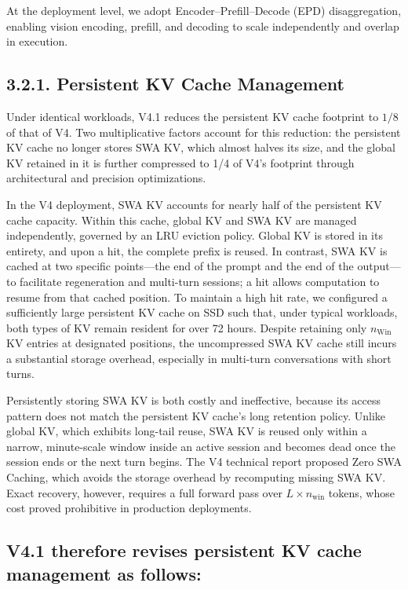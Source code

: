 \documentclass[
  10
]{article}
\begin{document}
At the deployment level, we adopt Encoder--Prefill--Decode (EPD)
disaggregation, enabling vision encoding, prefill, and decoding to scale
independently and overlap in execution.

\subsection{3.2.1. Persistent KV Cache
Management}\label{persistent-kv-cache-management}

Under identical workloads, V4.1 reduces the persistent KV cache
footprint to \(1 / 8\) of that of V4. Two multiplicative factors account
for this reduction: the persistent KV cache no longer stores SWA KV,
which almost halves its size, and the global KV retained in it is
further compressed to 1/4 of V4's footprint through architectural and
precision optimizations.

In the V4 deployment, SWA KV accounts for nearly half of the persistent
KV cache capacity. Within this cache, global KV and SWA KV are managed
independently, governed by an LRU eviction policy. Global KV is stored
in its entirety, and upon a hit, the complete prefix is reused. In
contrast, SWA KV is cached at two specific points---the end of the
prompt and the end of the output---to facilitate regeneration and
multi-turn sessions; a hit allows computation to resume from that cached
position. To maintain a high hit rate, we configured a sufficiently
large persistent KV cache on SSD such that, under typical workloads,
both types of KV remain resident for over 72 hours. Despite retaining
only \(n _ { \mathrm { W i n } }\) KV entries at designated positions,
the uncompressed SWA KV cache still incurs a substantial storage
overhead, especially in multi-turn conversations with short turns.

Persistently storing SWA KV is both costly and ineffective, because its
access pattern does not match the persistent KV cache's long retention
policy. Unlike global KV, which exhibits long-tail reuse, SWA KV is
reused only within a narrow, minute-scale window inside an active
session and becomes dead once the session ends or the next turn begins.
The V4 technical report proposed Zero SWA Caching, which avoids the
storage overhead by recomputing missing SWA KV. Exact recovery, however,
requires a full forward pass over \(L \times n _ { \mathrm { w i n } }\)
tokens, whose cost proved prohibitive in production deployments.

\subsection{V4.1 therefore revises persistent KV cache management as
follows:}\label{v4.1-therefore-revises-persistent-kv-cache-management-as-follows}
\end{document}
